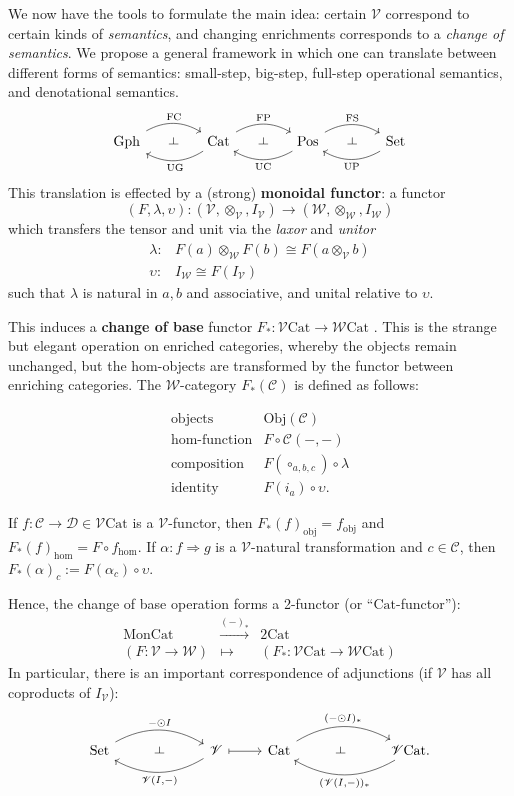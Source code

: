 \documentclass{amsart}
\theoremstyle{definition}
\def\ld{\rotatebox[origin=c]{-90}{$\dashv$}} %
\newcommand{\Gph}{\mathrm{Gph}}
\newcommand{\Set}{\mathrm{Set}}
\newcommand{\Cat}{\mathrm{Cat}}
\newcommand{\Mon}{\mathrm{Mon}}
\newcommand{\Pos}{\mathrm{Pos}}
\newcommand{\FC}{\mathrm{FC}}
\newcommand{\FP}{\mathrm{FP}}
\newcommand{\FS}{\mathrm{FS}}
\newcommand{\UC}{\mathrm{UC}}
\newcommand{\UP}{\mathrm{UP}}
\newcommand{\UG}{\mathrm{UG}}
\newcommand{\V}{\mathscr{V}}
\newcommand{\W}{\mathscr{W}}
\newcommand{\D}{\mathscr{D}}
\newcommand{\C}{\mathscr{C}}
\newcommand{\maps}{\colon}
\begin{document}
We now have the tools to formulate the main idea: certain $\V$ correspond to certain kinds of \textit{semantics}, and changing enrichments corresponds to a \textit{change of semantics}. We propose a general framework in which one can translate between different forms of semantics: small-step, big-step, full-step operational semantics, and denotational semantics.
\[\begin{tikzcd}[column sep=small]
\Gph \arrow[bend left,below]{rr}{\FC}
& \ld &
\arrow[bend left,above]{ll}{\UG} \Cat \arrow[bend left,below]{rr}{\FP}
& \ld &
\arrow[bend left,above]{ll}{\UC} \Pos \arrow[bend left,below]{rr}{\FS}
& \ld &
\Set \arrow[bend left,above]{ll}{\UP}
\end{tikzcd}\]
This translation is effected by a (strong) \textbf{monoidal functor}: a functor $$(F,\lambda,\upsilon)\maps (\V,\otimes_\V,I_\V) \to (\W,\otimes_\W,I_\W)$$ which transfers the tensor and unit via the \textit{laxor} and \textit{unitor}
\[\begin{array}{rl}
\lambda\maps & F(a) \otimes_\W F(b) \cong F(a\otimes_\V b)\\
\upsilon\maps & I_\W \cong F(I_\V)
\end{array}\]
such that $\lambda$ is natural in $a,b$ and associative, and unital relative to $\upsilon$.

This induces a \textbf{change of base} functor $F_*\maps\V\Cat \to \W\Cat$ \cite{borceux}. This is the strange but elegant operation on enriched categories, whereby the objects remain unchanged, but the hom-objects are transformed by the functor between enriching categories. The $\W$-category $F_*(\C)$ is defined as follows:

\[\begin{array}{rl}
\text{objects} & \text{Obj}(\C)\\
\text{hom-function} & F \circ \C(-,-)\\
\text{composition} & F(\circ_{a,b,c}) \circ \lambda\\
\text{identity} & F(i_a) \circ \upsilon.
\end{array}\]

If $f\maps \C \to \D \in \V\Cat$ is a $\V$-functor, then $F_*(f)_{\text{obj}} = f_{\text{obj}}$ and $F_*(f)_{\text{hom}} = F\circ f_{\text{hom}}$. If $\alpha\maps f \Rightarrow g$ is a $\V$-natural transformation and $c\in \C$, then $F_*(\alpha)_c := F(\alpha_c) \circ \upsilon$.

Hence, the change of base operation forms a 2-functor (or ``$\Cat$-functor''):
\[\begin{array}{ccc}
\Mon\Cat & \xrightarrow{(-)_*} & 2\Cat\\
(F\maps \V\to\W) & \mapsto & (F_*\maps \V\Cat\to\W\Cat)
\end{array}\]
In particular, there is an important correspondence of adjunctions (if $\V$ has all coproducts of $I_\V$):
\[\begin{tikzcd}
	\Set \arrow[bend left,below]{rr}{-\odot I}
	& \ld &
	\arrow[bend left,above]{ll}{\V(I,-)} \V
	\arrow[maps to]{r}
	& \Cat \arrow[bend left,below]{rr}{(-\odot I)_*}
	& \ld &
	\arrow[bend left,above]{ll}{(\V(I,-))_*} \V\Cat.
\end{tikzcd}\]
\end{document}
